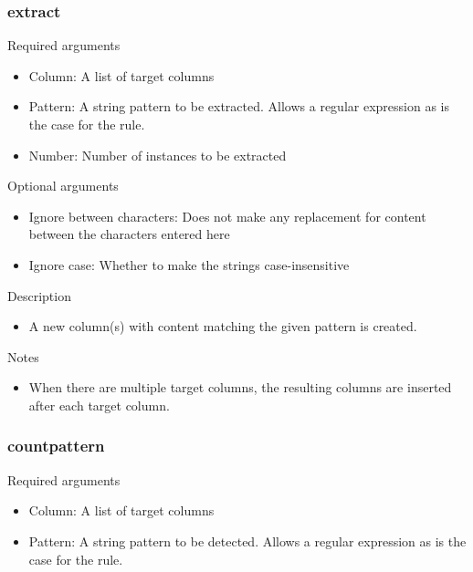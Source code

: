 \documentclass[letterpaper,10pt,english]{sphinxmanual}
\begin{document}
\subsubsection{extract}
\label{\detokenize{discovery/part07/rule_kinds:extract}}
Required arguments
\begin{itemize}
\item {} 
Column: A list of target columns

\item {} 
Pattern: A string pattern to be extracted. Allows a regular expression as is the case for the {\hyperref[\detokenize{discovery/part07/rule_kinds:replace}]{}} rule.

\item {} 
Number: Number of instances to be extracted

\end{itemize}

Optional arguments
\begin{itemize}
\item {} 
Ignore between characters: Does not make any replacement for content between the characters entered here

\item {} 
Ignore case: Whether to make the strings case-insensitive

\end{itemize}

Description
\begin{itemize}
\item {} 
A new column(s) with content matching the given pattern is created.

\end{itemize}

Notes
\begin{itemize}
\item {} 
When there are multiple target columns, the resulting columns are inserted after each target column.

\end{itemize}


\subsubsection{countpattern}
\label{\detokenize{discovery/part07/rule_kinds:countpattern}}
Required arguments
\begin{itemize}
\item {} 
Column: A list of target columns

\item {} 
Pattern: A string pattern to be detected. Allows a regular expression as is the case for the {\hyperref[\detokenize{discovery/part07/rule_kinds:replace}]{}} rule.

\end{itemize}
\end{document}
